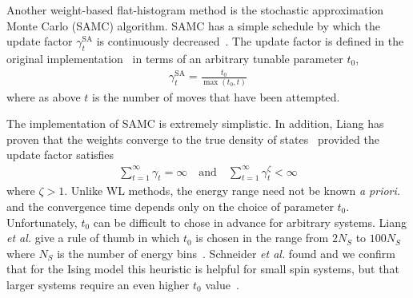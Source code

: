 Another weight-based flat-histogram method is
the stochastic approximation Monte Carlo (SAMC) algorithm. SAMC has a simple
schedule by which the update factor $\gamma^{\text{SA}}_t$ is continuously
decreased~\cite{liang2007stochastic, werlich2015stochastic,
schneider2017convergence}.  The update factor is defined in the
original implementation~\cite{liang2007stochastic} in terms of an
arbitrary tunable parameter $t_0$,
\begin{align}
\gamma_{t}^{\text{SA}} =\frac{t_0}{\max(t_0,t)}
\end{align}
where as above $t$ is the number of moves that have been attempted.

The implementation of SAMC is extremely simplistic.
In addition, Liang has proven that the weights converge to the true
density of states~\cite{liang2006theory, liang2007stochastic,
liang2009improving} provided the update factor satisfies
\begin{align}
\sum_{t=1}^\infty \gamma_{t} = \infty \quad\textrm{and}\quad
\sum_{t=1}^\infty \gamma_{t}^\zeta < \infty
\end{align}
where $\zeta > 1$.  Unlike WL methods, the energy range need not be
known \emph{a priori.} and the convergence time depends only on the choice of
parameter $t_0$.
Unfortunately, $t_0$ can be difficult to chose in advance
for arbitrary systems.
Liang \emph{et al.} give a rule of thumb in
which $t_0$ is chosen in the range from $2N_S$ to $100N_S$ where $N_S$
is the number of energy bins~\cite{liang2007stochastic}.  Schneider
\emph{et al.} found and we confirm that for the Ising model this heuristic is helpful for small spin systems, but that larger systems require an even higher
$t_0$ value~\cite{schneider2017convergence}.


